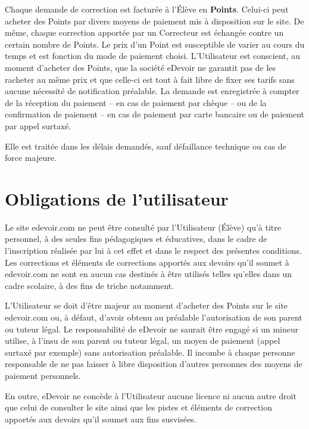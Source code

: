 Chaque demande de correction est facturée à l’\'Elève en \textbf{Points}. Celui-ci peut acheter des Points par divers moyens de paiement mis à disposition sur le site. De même, chaque correction apportée par un Correcteur est échangée contre un certain nombre de Points. Le prix d'un Point est susceptible de varier au cours du temps et est fonction du mode de paiement choisi. L'Utilisateur est conscient, au moment d'acheter des Points, que la société eDevoir ne garantit pas de les racheter au même prix et que celle-ci est tout à fait libre de fixer ses tarifs sans aucune nécessité de notification préalable.
La demande est enregistrée à compter de la réception du paiement -- en cas de paiement par chèque -- ou de la confirmation de paiement -- en cas de paiement par carte bancaire ou de paiement par appel surtaxé.

Elle est traitée dans les délais demandés, sauf défaillance technique ou cas de force majeure.


\section{Obligations de l'utilisateur}

Le site edevoir.com ne peut être consulté par l'Utilisateur (\'Elève) qu'à titre personnel, à des seules fins pédagogiques et éducatives, dans le cadre de l’inscription réalisée par lui à cet effet et dans le respect des présentes conditions. Les corrections et éléments de corrections apportés aux devoirs qu’il soumet à edevoir.com ne sont en aucun cas destinés à être utilisés telles qu’elles dans un cadre scolaire, à des fins de triche notamment.

L'Utilisateur se doit d'être majeur au moment d'acheter des Points sur le site edevoir.com ou, à défaut, d'avoir obtenu au préalable l'autorisation de son parent ou tuteur légal. Le responsabilité de eDevoir ne saurait être engagé si un mineur utilise, à l'insu de son parent ou tuteur légal, un moyen de paiement (appel surtaxé par exemple) sans autorisation préalable. Il incombe à chaque personne responsable de ne pas laisser à libre disposition d'autres personnes des moyens de paiement personnels.

En outre, eDevoir ne concède à l'Utilisateur aucune licence ni aucun autre droit que celui de consulter le site ainsi que les pistes et éléments de correction apportés aux devoirs qu’il soumet aux fins susvisées.

